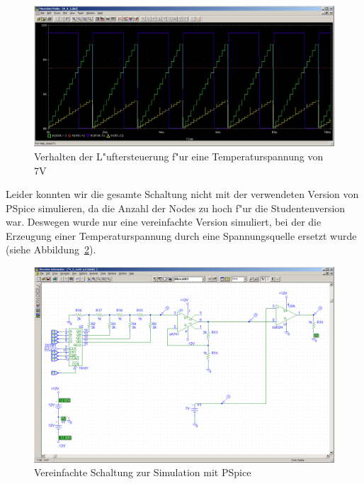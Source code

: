 \begin{figure}[ht]
 \centering
 \includegraphics[width=\textwidth]{./img/4_4_7V.PNG}
 \caption{Verhalten der L"uftersteuerung f"ur eine Temperaturspannung von 7V}
 \label{fig:4_4_7V}
\end{figure}

Leider konnten wir die gesamte Schaltung nicht mit der verwendeten Version von PSpice simulieren, da die Anzahl der Nodes zu hoch f"ur die Studentenversion war. Deswegen wurde nur eine vereinfachte Version simuliert, bei der die Erzeugung einer Temperaturspannung durch eine Spannungsquelle ersetzt wurde (siehe Abbildung~\ref{fig:4_4_1_schem}).

\begin{figure}[ht]
 \centering
 \includegraphics[width=\textwidth]{./img/4_4_1_schem.PNG}
 \caption{Vereinfachte Schaltung zur Simulation mit PSpice}
 \label{fig:4_4_1_schem}
\end{figure}
